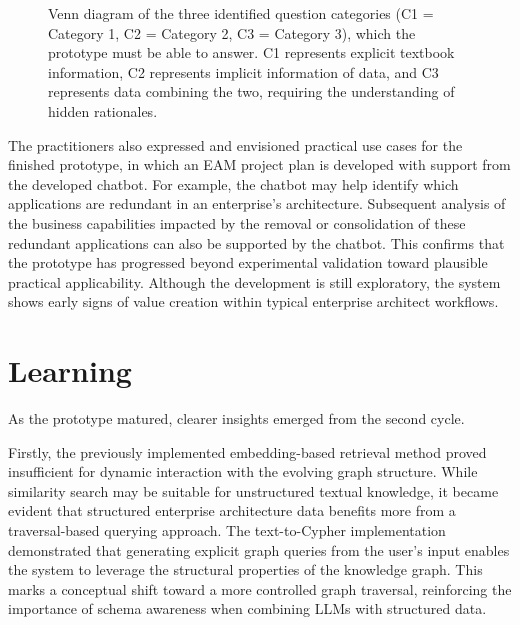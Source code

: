 \begin{figure}[h]
\centering
{}
\caption{Venn diagram of the three identified question categories 
(C1 = Category 1, C2 = Category 2, C3 = Category 3), 
which the prototype must be able to answer. C1 represents explicit textbook information, C2 represents implicit information of data, and C3 represents data combining the two, requiring the understanding of hidden rationales.}
\label{fig:vennCategories}
\end{figure}


The practitioners also expressed and envisioned practical use cases for the finished prototype, in which an EAM project plan is developed with support from the developed chatbot. For example, the chatbot may help identify which applications are redundant in an enterprise's architecture. Subsequent analysis of the business capabilities impacted by the removal or consolidation of these redundant applications can also be supported by the chatbot. This confirms that the prototype has progressed beyond experimental validation toward plausible practical applicability. Although the development is still exploratory, the system shows early signs of value creation within typical enterprise architect workflows.

\section{Learning}
\label{sec:cycle2_learning}
As the prototype matured, clearer insights emerged from the second cycle.

Firstly, the previously implemented embedding-based retrieval method proved insufficient for dynamic interaction with the evolving graph structure. While similarity search may be suitable for unstructured textual knowledge, it became evident that structured enterprise architecture data benefits more from a traversal-based querying approach. The text-to-Cypher implementation demonstrated that generating explicit graph queries from the user’s input enables the system to leverage the structural properties of the knowledge graph. This marks a conceptual shift toward a more controlled graph traversal, reinforcing the importance of schema awareness when combining LLMs with structured data.

